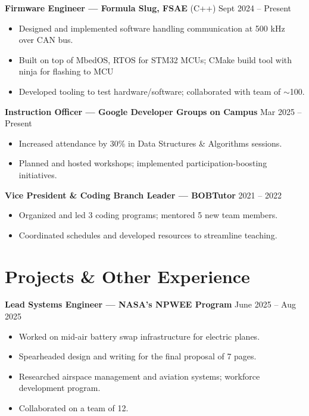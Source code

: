 \documentclass[a4paper,10pt]{article}
\begin{document}
\textbf{Firmware Engineer --- Formula Slug, FSAE} (C++) \hfill Sept 2024 -- Present
\begin{itemize}
    \item Designed and implemented software handling communication at 500 kHz \\
        over CAN bus.
    \item Built on top of MbedOS, RTOS for STM32 MCUs; CMake build tool with \\
        ninja for flashing to MCU
    \item Developed tooling to test hardware/software; collaborated with team of $\sim$100.
\end{itemize}

\textbf{Instruction Officer --- Google Developer Groups on Campus} \hfill Mar 2025 -- Present
\begin{itemize}
    \item Increased attendance by 30\% in Data Structures \& Algorithms sessions.
    \item Planned and hosted workshops; implemented participation-boosting initiatives.
\end{itemize}

\textbf{Vice President \& Coding Branch Leader --- BOBTutor} \hfill 2021 -- 2022
\begin{itemize}
    \item Organized and led 3 coding programs; mentored 5 new team members.
    \item Coordinated schedules and developed resources to streamline teaching.
\end{itemize}

\section*{Projects \& Other Experience}
\textbf{Lead Systems Engineer --- NASA's NPWEE Program} \hfill June 2025 -- Aug 2025
\begin{itemize}
    \item Worked on mid-air battery swap infrastructure for electric planes.
    \item Spearheaded design and writing for the final proposal of 7 pages.
    \item Researched airspace management and aviation systems; workforce development program.
    \item Collaborated on a team of 12.
\end{itemize}
\end{document}
